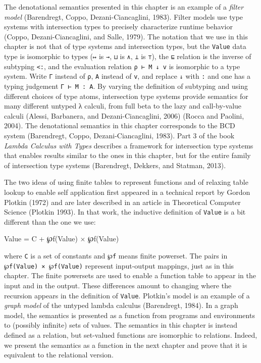 The denotational semantics presented in this chapter is an example of a
\emph{filter model} (Barendregt, Coppo, Dezani-Ciancaglini, 1983).
Filter models use type systems with intersection types to precisely
characterize runtime behavior (Coppo, Dezani-Ciancaglini, and Salle,
1979). The notation that we use in this chapter is not that of type
systems and intersection types, but the \texttt{Value} data type is
isomorphic to types (\texttt{↦} is \texttt{→}, \texttt{⊔} is \texttt{∧},
\texttt{⊥} is \texttt{⊤}), the \texttt{⊑} relation is the inverse of
subtyping \texttt{\textless{}:}, and the evaluation relation
\texttt{ρ\ ⊢\ M\ ↓\ v} is isomorphic to a type system. Write \texttt{Γ}
instead of \texttt{ρ}, \texttt{A} instead of \texttt{v}, and replace
\texttt{↓} with \texttt{:} and one has a typing judgement
\texttt{Γ\ ⊢\ M\ :\ A}. By varying the definition of subtyping and using
different choices of type atoms, intersection type systems provide
semantics for many different untyped λ calculi, from full beta to the
lazy and call-by-value calculi (Alessi, Barbanera, and
Dezani-Ciancaglini, 2006) (Rocca and Paolini, 2004). The denotational
semantics in this chapter corresponds to the BCD system (Barendregt,
Coppo, Dezani-Ciancaglini, 1983). Part 3 of the book \emph{Lambda
Calculus with Types} describes a framework for intersection type systems
that enables results similar to the ones in this chapter, but for the
entire family of intersection type systems (Barendregt, Dekkers, and
Statman, 2013).

The two ideas of using finite tables to represent functions and of
relaxing table lookup to enable self application first appeared in a
technical report by Gordon Plotkin (1972) and are later described in an
article in Theoretical Computer Science (Plotkin 1993). In that work,
the inductive definition of \texttt{Value} is a bit different than the
one we use:

\begin{myDisplay}
Value = C + ℘f(Value) × ℘f(Value)
\end{myDisplay}

where \texttt{C} is a set of constants and \texttt{℘f} means finite
powerset. The pairs in \texttt{℘f(Value)\ ×\ ℘f(Value)} represent
input-output mappings, just as in this chapter. The finite powersets are
used to enable a function table to appear in the input and in the
output. These differences amount to changing where the recursion appears
in the definition of \texttt{Value}. Plotkin's model is an example of a
\emph{graph model} of the untyped lambda calculus (Barendregt, 1984). In
a graph model, the semantics is presented as a function from programs
and environments to (possibly infinite) sets of values. The semantics in
this chapter is instead defined as a relation, but set-valued functions
are isomorphic to relations. Indeed, we present the semantics as a
function in the next chapter and prove that it is equivalent to the
relational version.


